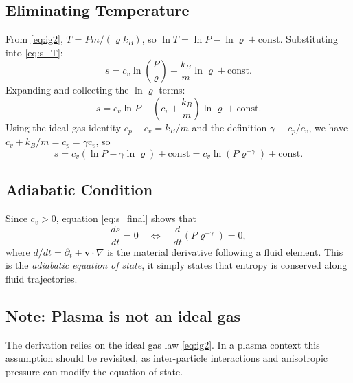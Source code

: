\subsection*{Eliminating Temperature}
 
From \eqref{eq:ig2}, $T = Pm/( \varrho k_B)$, so $\ln T = \ln P - \ln \varrho +
\text{const}$. Substituting into \eqref{eq:s_T}:
\begin{equation*}
    s = c_v\ln\!\left(\frac{P}{ \varrho}\right) - \frac{k_B}{m}\ln \varrho + \text{const}.
\end{equation*}
Expanding and collecting the $\ln \varrho$ terms:
\begin{equation*}
    s = c_v\ln P - \left(c_v + \frac{k_B}{m}\right)\ln \varrho + \text{const}.
\end{equation*}
Using the ideal-gas identity $c_p - c_v = k_B/m$ and the definition
$\gamma \equiv c_p/c_v$, we have $c_v + k_B/m = c_p = \gamma c_v$, so
\begin{equation}
    s = c_v\!\left(\ln P - \gamma\ln \varrho\right) + \text{const}
      = c_v\ln\!\left(P \varrho^{-\gamma}\right) + \text{const}.
    \label{eq:s_final}
\end{equation}
 
\subsection*{Adiabatic Condition}
 
Since $c_v > 0$, equation \eqref{eq:s_final} shows that
\begin{equation*}
    \frac{ds}{dt} = 0
    \quad\iff\quad
    \frac{d}{dt}\!\left(P \varrho^{-\gamma}\right) = 0,
\end{equation*}
where $d/dt = \partial_t + \mathbf{v}\cdot\nabla$ is the material derivative
following a fluid element. This is the \emph{adiabatic equation of state}, it simply states 
 that entropy is conserved along fluid trajectories.
 

\subsection*{Note: Plasma is not an ideal gas}
The derivation relies on the ideal gas law \eqref{eq:ig2}. In a plasma context this assumption should
be revisited, as inter-particle interactions and anisotropic pressure can modify the equation of state.
